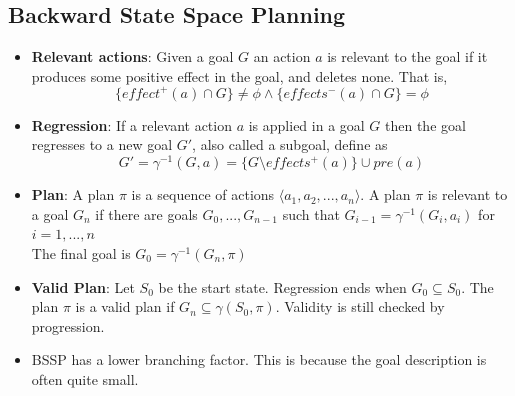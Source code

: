 \documentclass[a4paper]{article}
\begin{document}
\subsection{Backward State Space Planning}
\begin{itemize}
    \item \textbf{Relevant actions}: Given a goal $G$ an action $a$ is relevant to the goal if it produces some positive effect in the goal, and deletes none. That is,
    \begin{equation*}
        \{effect^+(a)\cap G\}\neq \phi \land \{effects^-(a)\cap G\}=\phi
    \end{equation*}
    \item \textbf{Regression}: If a relevant action $a$ is applied in a goal $G$ then the goal regresses to a new goal $G'$, also called a subgoal, define as
    \begin{equation*}
        G'=\gamma^{-1}(G,a)=\{G\text{\textbackslash}effects^+(a)\} \cup pre(a)
    \end{equation*}
    \item \textbf{Plan}: A plan $\pi$ is a sequence of actions $\langle a_1,a_2,...,a_n\rangle$. A plan $\pi$ is relevant to a goal $G_n$ if there are goals $G_0,...,G_{n-1}$ such that $G_{i-1}=\gamma^{-1}(G_i,a_i)$ for $i=1,...,n$\\
    The final goal is $G_0=\gamma^{-1}(G_n,\pi)$
    \item \textbf{Valid Plan}: Let $S_0$ be the start state. Regression ends when $G_0\subseteq S_0$. The plan $\pi$ is a valid plan if $G_n\subseteq \gamma(S_0,\pi)$. Validity is still checked by progression.
    \item BSSP has a lower branching factor. This is because the goal description is often quite small.
\end{itemize}
\end{document}
